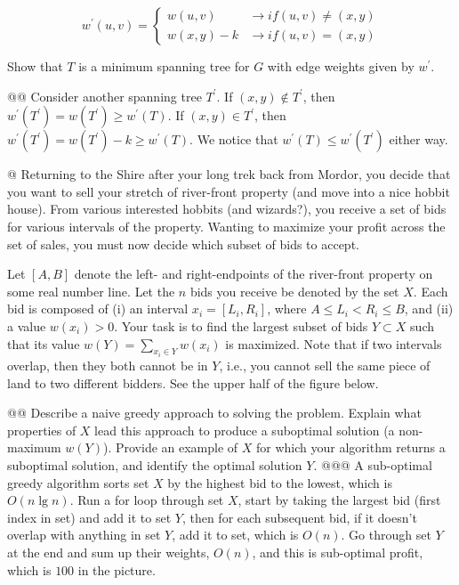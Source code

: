 \documentclass[10pt]{article}\usepackage[]{graphicx}\usepackage[]{xcolor}
\begin{document}
\begin{easylist}[enumerate]
    \[
        w^\prime (u, v) =
        \begin{cases}
            w(u, v) &\to if (u, v) \neq (x, y)\\
            w(x, y) - k &\to if (u, v) = (x, y)
        \end{cases}
    \]

    Show that $T$ is a minimum spanning tree for $G$ with edge weights given by $w^\prime$.

    @@ Consider another spanning tree $T^\prime$. If $(x,y) \not\in T^\prime$, then $w^\prime (T^\prime) = w(T^\prime)
    \ge w^\prime(T)$. If $(x,y) \in T^\prime$, then $w^\prime(T^\prime) = w(T^\prime)-k \ge w^\prime(T)$. We notice that
    $w^\prime(T) \le w^\prime(T^\prime)$ either way.

    @ Returning to the Shire after your long trek back from Mordor, you decide that you want to sell your stretch of
    river-front property (and move into a nice hobbit house). From various interested hobbits (and wizards?), you
    receive a set of bids for various intervals of the property. Wanting to maximize your profit across the set of
    sales, you must now decide which subset of bids to accept.\newline

    Let $[A, B]$ denote the left- and right-endpoints of the river-front property on some real number line. Let the $n$
    bids you receive be denoted by the set $X$. Each bid is composed of (i) an interval $x_i = [ L_i , R_i ]$, where $A
    \le L_i < R_i \le B$, and (ii) a value $w(x_i) > 0$. Your task is to find the largest subset of bids $Y \subset X$
    such that its value $w(Y) = \sum_{x_i \in Y} w(x_i)$ is maximized. Note that if two intervals overlap, then they
    both cannot be in $Y$, i.e., you cannot sell the same piece of land to two different bidders.  See the upper half of
    the figure below.

    @@ Describe a naive greedy approach to solving the problem. Explain what properties of $X$ lead this approach to
    produce a suboptimal solution (a non-maximum $w(Y)$). Provide an example of $X$ for which your algorithm returns a
    suboptimal solution, and identify the optimal solution $Y$.
    @@@ A sub-optimal greedy algorithm sorts set $X$ by the highest bid to the lowest, which is $O(n \lg n)$.  Run a
    {\ttfamily for loop} through set $X$, start by taking the largest bid (first index in set) and add it to set $Y$,
    then for each subsequent bid, if it doesn't overlap with anything in set $Y$, add it to set, which is $O(n)$.  Go
    through set $Y$ at the end and sum up their weights, $O(n)$, and this is sub-optimal profit, which is $100$ in the
    picture.\newline


\end{easylist}
\end{document}

